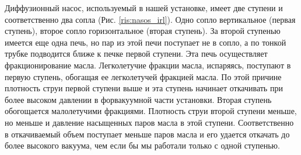 \documentclass[a4paper, 12pt]{article}
\begin{document}
    Диффузионный насос, используемый в нашей установке, имеет две ступени и соответственно два сопла (Рис. \ref{ris:nasos_irl}). Одно сопло вертикальное (первая ступень), второе сопло горизонтальное (вторая ступень). За второй ступенью имеется еще одна печь, но пар из этой печи поступает не в сопло, а по тонкой трубке подводится ближе к печке первой ступени. Эта печь осуществляет фракционирование масла. Легколетучие фракции масла, испаряясь, поступают в первую ступень, обогащая ее легколетучей фракцией масла. По этой причине плотность струи первой ступени выше и эта ступень начинает откачивать при более высоком давлении в форвакуумной части установки. Вторая ступень обогощается малолетучими фракциями. Плотность струи второй ступени меньше, но меньше и давление насыщенных паров масла в этой ступени. Соответственно в откачиваемый объем поступает меньше паров масла и его удается откачать до более высокого вакуума, чем если бы мы работали только с одной ступенью.
\end{document}
